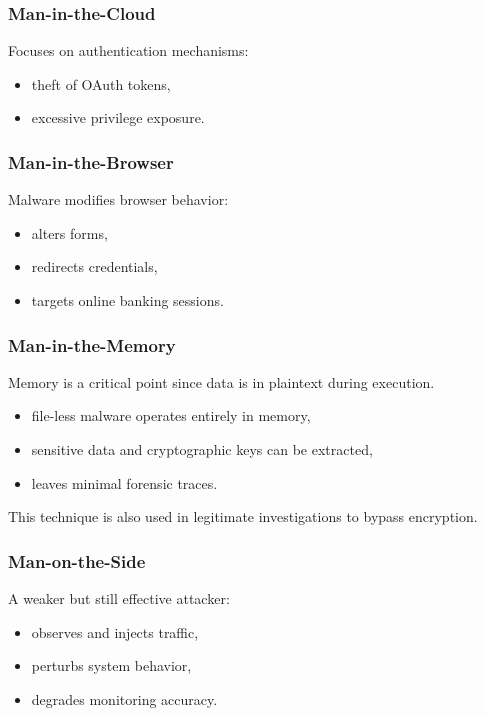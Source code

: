\subsubsection{Man-in-the-Cloud}

Focuses on authentication mechanisms:
\begin{itemize}
    \item theft of OAuth tokens,
    \item excessive privilege exposure.
\end{itemize}

\subsubsection{Man-in-the-Browser}

Malware modifies browser behavior:
\begin{itemize}
    \item alters forms,
    \item redirects credentials,
    \item targets online banking sessions.
\end{itemize}

\subsubsection{Man-in-the-Memory}

Memory is a critical point since data is in plaintext during execution.

\begin{itemize}
    \item file-less malware operates entirely in memory,
    \item sensitive data and cryptographic keys can be extracted,
    \item leaves minimal forensic traces.
\end{itemize}

\noindent
This technique is also used in legitimate investigations to bypass encryption.

\subsubsection{Man-on-the-Side}

A weaker but still effective attacker:
\begin{itemize}
    \item observes and injects traffic,
    \item perturbs system behavior,
    \item degrades monitoring accuracy.
\end{itemize}

